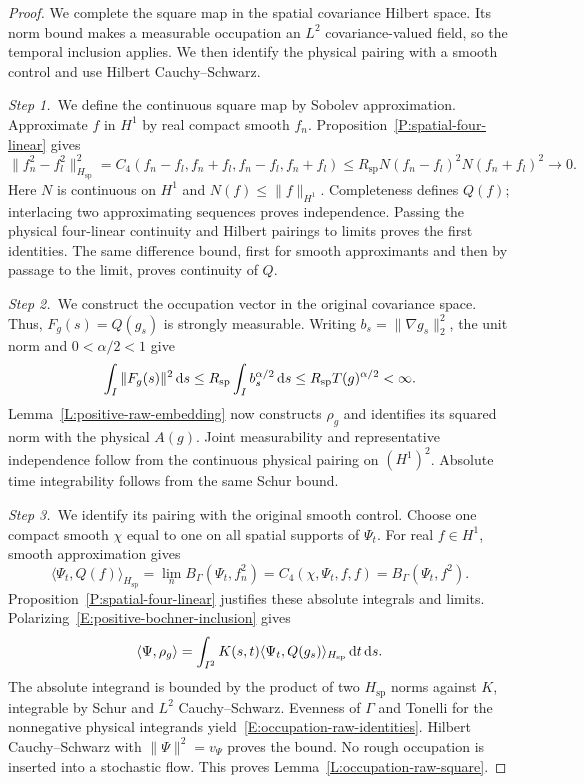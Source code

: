 \begin{proof}
  We complete the square map in the spatial covariance Hilbert space. Its norm
  bound makes a measurable occupation an $L^2$ covariance-valued field, so the
  temporal inclusion applies. We then identify the physical pairing with a
  smooth control and use Hilbert Cauchy--Schwarz.


  \medskip
  \noindent\textit{Step 1.~}We define the continuous square map by Sobolev
  approximation.
  Approximate $f$ in $H^1$ by real compact smooth $f_n$.
  Proposition~\ref{P:spatial-four-linear} gives
  \[
    \|f_n^2-f_l^2\|_{H_{\mathrm{sp}}}^2
    =C_4(f_n-f_l,f_n+f_l,f_n-f_l,f_n+f_l)
    \le R_{\mathrm{sp}}N(f_n-f_l)^2N(f_n+f_l)^2\to0.
  \]
  Here $N$ is continuous on $H^1$ and $N(f) \le \|f\|_{H^1}$. Completeness
  defines $Q(f)$; interlacing two approximating sequences proves independence.
  Passing the physical four-linear continuity and Hilbert pairings to limits
  proves the first identities. The same difference bound, first for smooth
  approximants and then by passage to the limit, proves continuity of $Q$.


  \medskip
  \noindent\textit{Step 2.~}We construct the occupation vector in the original
  covariance space.
  Thus, $F_g(s) = Q(g_s)$ is strongly measurable. Writing $b_s = \|\nabla
  g_s\|_2^2$, the unit norm and $0 < \alpha/2 < 1$ give
  \[
    \int_I\|F_g(s)\|^2\,\mathrm{d} s
    \le R_{\mathrm{sp}}\int_I b_s^{\alpha/2}\,\mathrm{d} s
    \le R_{\mathrm{sp}}T(g)^{\alpha/2}<\infty .
  \]
  Lemma~\ref{L:positive-raw-embedding} now constructs $\rho_g$ and identifies
  its squared norm with the physical $A(g)$. Joint measurability and
  representative independence follow from the continuous physical pairing on
  $(H^1)^2$. Absolute time integrability follows from the same Schur bound.


  \medskip
  \noindent\textit{Step 3.~}We identify its pairing with the original smooth
  control.
  Choose one compact smooth $\chi$ equal to one on all spatial supports of
  $\Psi_t$. For real $f \in H^1$, smooth approximation gives
  \[
    \langle\Psi_t,Q(f)\rangle_{H_{\mathrm{sp}}}
    =\lim_n B_\Gamma(\Psi_t,f_n^2)
    =C_4(\chi,\Psi_t,f,f)=B_\Gamma(\Psi_t,f^2).
  \]
  Proposition~\ref{P:spatial-four-linear} justifies these absolute integrals and
  limits. Polarizing~\eqref{E:positive-bochner-inclusion} gives
  \[
    \langle\Psi,\rho_g\rangle
    =\int_{I^2}K(s,t)\langle\Psi_t,Q(g_s)\rangle_{H_{\mathrm{sp}}}
    \,\mathrm{d} t\,\mathrm{d} s .
  \]
  The absolute integrand is bounded by the product of two $H_{\mathrm{sp}}$
  norms against $K$, integrable by Schur and $L^2$ Cauchy--Schwarz. Evenness of
  $\Gamma$ and Tonelli for the nonnegative physical integrands
  yield~\eqref{E:occupation-raw-identities}. Hilbert Cauchy--Schwarz with
  $\|\Psi\|^2 = v_\Psi$ proves the bound. No rough occupation is inserted into a
  stochastic flow. This proves Lemma~\ref{L:occupation-raw-square}.
\end{proof}


